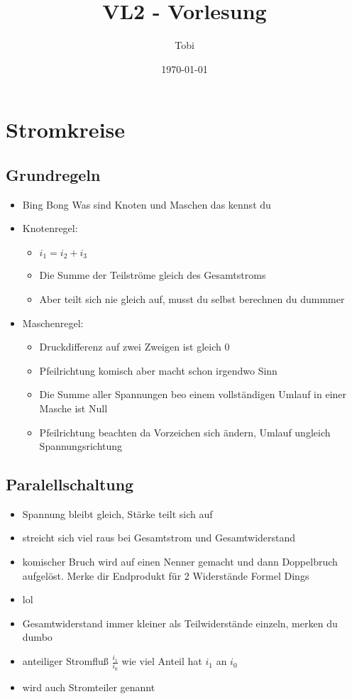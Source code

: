\documentclass[a4paper,12pt]{article}
\title{VL2 - Vorlesung}
\author{Tobi}
\date{\today}
\begin{document}
\maketitle

\section*{Stromkreise}

\subsection*{Grundregeln}

\begin{itemize}
    \item Bing Bong Was sind Knoten und Maschen das kennst du
    \item Knotenregel:
    \begin{itemize}
        \item $i_1 = i_2 + i_3$ 
        \item Die Summe der Teilströme gleich des Gesamtstroms
        \item Aber teilt sich nie gleich auf, musst du selbst berechnen du dummmer
    \end{itemize}
    \item Maschenregel:
    \begin{itemize}
        \item Druckdifferenz auf zwei Zweigen ist gleich 0
        \item Pfeilrichtung komisch aber macht schon irgendwo Sinn
        \item Die Summe aller Spannungen beo einem vollständigen Umlauf in einer Masche ist Null
        \item Pfeilrichtung beachten da Vorzeichen sich ändern, Umlauf ungleich Spannungsrichtung
    \end{itemize}
    
\end{itemize}

\subsection*{Paralellschaltung}

\begin{itemize}
    \item Spannung bleibt gleich, Stärke teilt sich auf 
    \item streicht sich viel raus bei Gesamtstrom und Gesamtwiderstand
    \item komischer Bruch wird auf einen Nenner gemacht und dann Doppelbruch aufgelöst. Merke dir Endprodukt für 2 Widerstände Formel Dings
    \item lol
    \item Gesamtwiderstand immer kleiner als Teilwiderstände einzeln, merken du dumbo
    \item anteiliger Stromfluß $\frac{i_1}{i_0}$ wie viel Anteil hat $i_1$ an $i_0$
    \item wird auch Stromteiler genannt
\end{itemize}
\end{document}
